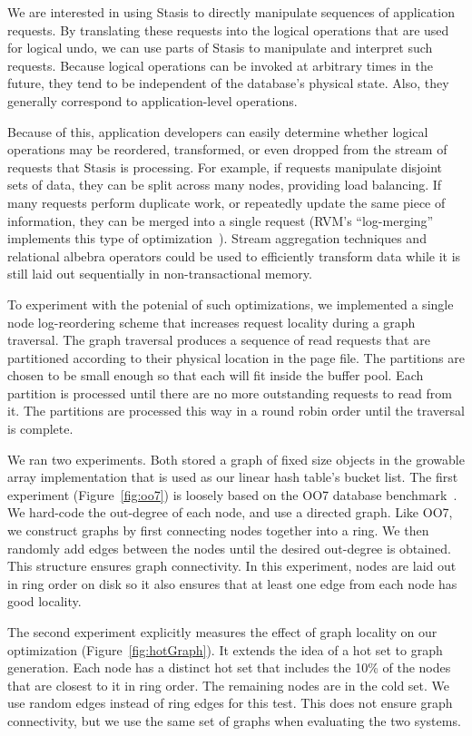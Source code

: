 \documentclass[letterpaper,twocolumn,10pt]{article}
\newcommand{\yad}{Stasis\xspace}
\begin{document}
We are interested in using \yad to directly manipulate sequences of
application requests.  By translating these requests into the logical
operations that are used for logical undo, we can use parts of \yad to
manipulate and interpret such requests.  Because logical operations
can be invoked at arbitrary times in the future, they tend to be
independent of the database's physical state.  Also, they generally
correspond to application-level operations.

Because of this, application developers can easily determine whether
logical operations may be reordered, transformed, or even dropped from
the stream of requests that \yad is processing.  For example, if
requests manipulate disjoint sets of data, they can be split across
many nodes, providing load balancing.  If many requests perform
duplicate work, or repeatedly update the same piece of information,
they can be merged into a single request (RVM's ``log-merging''
implements this type of optimization~\cite{lrvm}).  Stream aggregation
techniques and relational albebra operators could be used to
efficiently transform data while it is still laid out sequentially in
non-transactional memory.

To experiment with the potenial of such optimizations, we implemented
a single node log-reordering scheme that increases request locality
during a graph traversal.  The graph traversal produces a sequence of
read requests that are partitioned according to their physical
location in the page file.  The partitions are chosen to be small
enough so that each will fit inside the buffer pool.  Each partition
is processed until there are no more outstanding requests to read from
it.  The partitions are processed this way in a round robin order
until the traversal is complete.

We ran two experiments.  Both stored a graph of fixed size objects in
the growable array implementation that is used as our linear
hash table's bucket list.
The first experiment (Figure~\ref{fig:oo7})
is loosely based on the OO7 database benchmark~\cite{oo7}.  We
hard-code the out-degree of each node, and use a directed graph.  Like OO7, we
construct graphs by first connecting nodes together into a ring.
We then randomly add edges between the nodes until the desired
out-degree is obtained.  This structure ensures graph connectivity.
In this experiment, nodes are laid out in ring order on disk so it also ensures that at least
one edge from each node has good locality.

The second experiment explicitly measures the effect of graph locality
on our optimization (Figure~\ref{fig:hotGraph}). It extends the idea
of a hot set to graph generation.  Each node has a distinct hot set
that includes the 10\% of the nodes that are closest to it in ring
order.  The remaining nodes are in the cold set.  We use random edges
instead of ring edges for this test.  This does not ensure graph
connectivity, but we use the same set of graphs when evaluating the two systems.
\end{document}

